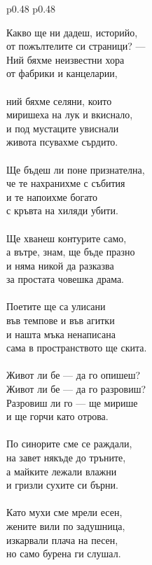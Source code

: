 \documentclass[12pt,a4paper]{article}
\begin{document}
\begin{tabular}{p{0.48\textwidth} p{0.48\textwidth}}
\begin{minipage}[t]{\linewidth}
Какво ще ни дадеш, историйо,\\
от пожълтелите си страници? —\\
Ний бяхме неизвестни хора\\
от фабрики и канцеларии,\\
\\
ний бяхме селяни, които\\
миришеха на лук и вкиснало,\\
и под мустаците увиснали\\
живота псувахме сърдито.\\
\\
Ще бъдеш ли поне признателна,\\
че те нахранихме с събития\\
и те напоихме богато\\
с кръвта на хиляди убити.\\
\\
Ще хванеш контурите само,\\
а вътре, знам, ще бъде празно\\
и няма никой да разказва\\
за простата човешка драма.\\
\\
Поетите ще са улисани\\
във темпове и във агитки\\
и нашта мъка ненаписана\\
сама в пространството ще скита.\\
\\
Живот ли бе — да го опишеш?\\
Живот ли бе — да го разровиш?\\
Разровиш ли го — ще мирише\\
и ще горчи като отрова.\\
\\
По синорите сме се раждали,\\
на завет някъде до тръните,\\
а майките лежали влажни\\
и гризли сухите си бърни.\\
\\
Като мухи сме мрели есен,\\
жените вили по задушница,\\
изкарвали плача на песен,\\
но само бурена ги слушал.\\

\end{minipage}
\end{tabular}
\end{document}
